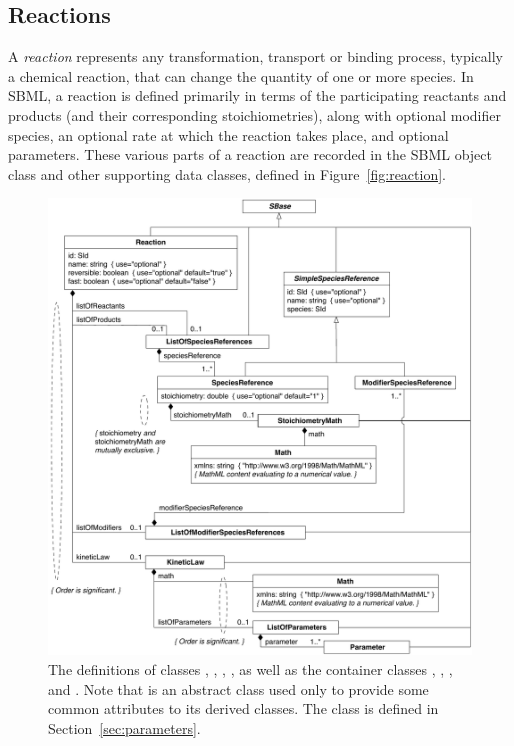 \subsection{Reactions}
\label{sec:reactions}

A \emph{reaction} represents any transformation, transport or
binding process, typically a chemical reaction, that can change
the quantity of one or more species.  In SBML, a reaction is
defined primarily in terms of the participating reactants and
products (and their corresponding stoichiometries), along with
optional modifier species, an optional rate at which the reaction
takes place, and optional parameters.  These various parts of a
reaction are recorded in the SBML \Reaction object class and other
supporting data classes, defined in Figure~\vref{fig:reaction}.

\begin{figure}[htb]
  \centering
  \vspace*{2ex}
  \includegraphics[scale=0.779]{figs/reaction-uml-v2}
  \vspace*{0.5ex}
  \caption{The definitions of classes \Reaction, \KineticLaw,
      \SpeciesReference, \ModifierSpeciesReference, as well as the
      container classes \ListOfReactants, \ListOfProducts,
      \ListOfModifiers, and \ListOfParameters.  Note that
      \SimpleSpeciesReference is an abstract class used only to
      provide some common attributes to its derived classes.  The class
      \Parameter is defined in Section~\ref{sec:parameters}.}
  \label{fig:reaction}
\end{figure}



